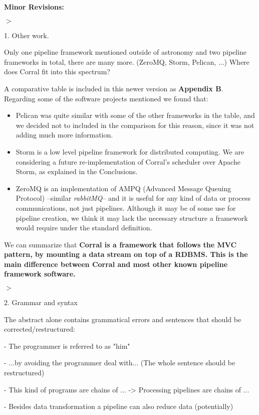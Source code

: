 \documentclass[a4paper,onecolumn,fleqn,usenatbib,useAMS]{mnrasr}
\newenvironment{myindentpar}[1]%
 {\begin{list}{}%
         \bigskip
         \color{refereecolor}
         {\setlength{\leftmargin}{#1}}%
         \itshape
         \item[$>$]%
 }
 {\end{list}}
\begin{document}
\vspace{2cm}
\textbf{Minor Revisions:}

\begin{myindentpar}{1cm}
1. Other work.

Only one pipeline framework mentioned outside of astronomy and two
pipeline frameworks in total, there are many more. (ZeroMQ, Storm,
Pelican, ...) Where does Corral fit into this spectrum?


\end{myindentpar}

%
A comparative table is included in this newer version as \textbf{Appendix B}.
Regarding some of the software projects mentioned we found that:
\begin{itemize}
 \item Pelican was quite similar with some of the other frameworks in the table, 
 and we decided not to included in the comparison for this reason, since it was not
 adding much more information.
 
 \item Storm is a low level pipeline framework for distributed computing. 
 We are considering a future re-implementation of Corral's scheduler   
 over Apache Storm, as explained in the Conclusions. 
 
 \item ZeroMQ is an implementation of AMPQ (Advanced Message Queuing Protocol) 
 --similar \textit{rabbitMQ}-- and it is useful for any kind of data or process 
 communications, not just pipelines. Although it may be of some use for pipeline 
 creation, we think it may lack the necessary structure a 
 framework would require under the standard definition.
\end{itemize}

We can summarize that
\textbf{Corral is a framework that follows the MVC pattern, by mounting a data stream
on top of a RDBMS. This is the main
difference between Corral and most other known pipeline framework software.}


\begin{myindentpar}{1cm}
2. Grammar and syntax

The abstract alone contains grammatical errors and sentences that
should be corrected/restructured:


 - The programmer is referred to as "him" 

 - ...by avoiding the programmer deal with... (The whole sentence
 should be restructured)

 - This kind of programs are chains of ... -> Processing pipelines are
 chains of ...

 - Besides data transformation a pipeline can also reduce data
 (potentially)

 
\end{myindentpar}
\end{document}
